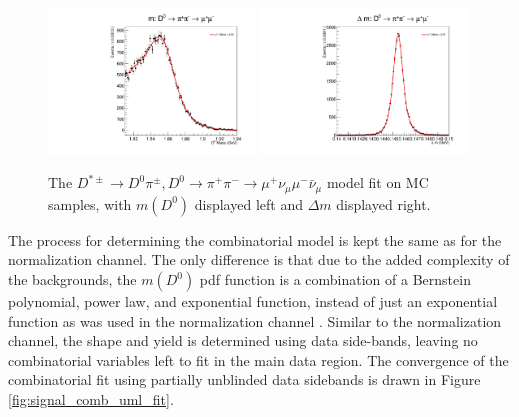 \begin{figure}[htp]
    \begin{center}
      \includegraphics[width=0.49\textwidth]{figures/chapter4/signal_fit/d0pipimm_2022_2023_0_m.pdf}
      \includegraphics[width=0.49\textwidth]{figures/chapter4/signal_fit/d0pipimm_2022_2023_0_dm.pdf}\\
    \end{center}
    \caption{
      The $D^{*\pm} \to D^0\pi^\pm, D^0 \to \pi^+ \pi^- \to \mu^+ \nu_\mu \mu^- \bar{\nu}_\mu$ model fit on MC samples, with $m(D^0)$ displayed left and $\Delta m$ displayed right.
    }
    \label{fig:d0munumunu_uml_fit}
\end{figure}


The process for determining the combinatorial model is kept the same as for the normalization channel. The only difference is that due to the added complexity of the backgrounds, the $m(D^0)$ pdf function is a combination of a Bernstein polynomial, power law, and exponential function, instead of just an exponential function as was used in the normalization channel \cite{ref:dauncey_2015}. Similar to the normalization channel, the shape and yield is determined using data side-bands, leaving no combinatorial variables left to fit in the main data region. The convergence of the combinatorial fit using partially unblinded data sidebands is drawn in Figure \ref{fig:signal_comb_uml_fit}.

